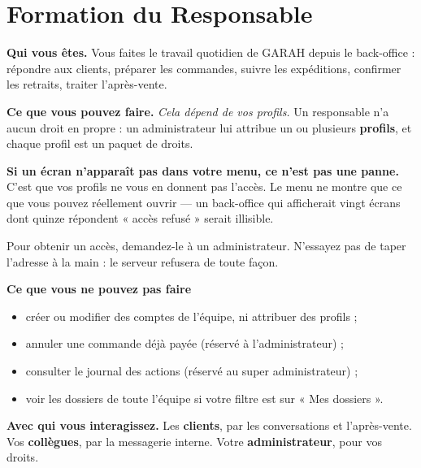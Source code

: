 \documentclass[11pt,a4paper]{report}
\begin{document}
\chapter{Formation du Responsable}
\label{ch:responsable}

\begin{roleBox}
\textbf{Qui vous êtes.} Vous faites le travail quotidien de GARAH depuis le
back-office : répondre aux clients, préparer les commandes, suivre les
expéditions, confirmer les retraits, traiter l'après-vente.

\medskip
\textbf{Ce que vous pouvez faire.} \emph{Cela dépend de vos profils.} Un
responsable n'a aucun droit en propre : un administrateur lui attribue un ou
plusieurs \textbf{profils}, et chaque profil est un paquet de droits.

\begin{attention}
\textbf{Si un écran n'apparaît pas dans votre menu, ce n'est pas une panne.}
C'est que vos profils ne vous en donnent pas l'accès. Le menu ne montre que ce
que vous pouvez réellement ouvrir — un back-office qui afficherait vingt écrans
dont quinze répondent « accès refusé » serait illisible.

Pour obtenir un accès, demandez-le à un administrateur. N'essayez pas de taper
l'adresse à la main : le serveur refusera de toute façon.
\end{attention}

\medskip
\textbf{Ce que vous ne pouvez pas faire}
\begin{itemize}[leftmargin=*,itemsep=2pt,topsep=3pt]
  \item créer ou modifier des comptes de l'équipe, ni attribuer des profils ;
  \item annuler une commande déjà payée (réservé à l'administrateur) ;
  \item consulter le journal des actions (réservé au super administrateur) ;
  \item voir les dossiers de toute l'équipe si votre filtre est sur
        « Mes dossiers ».
\end{itemize}

\medskip
\textbf{Avec qui vous interagissez.} Les \textbf{clients}, par les
conversations et l'après-vente. Vos \textbf{collègues}, par la messagerie
interne. Votre \textbf{administrateur}, pour vos droits.
\end{roleBox}
\end{document}
